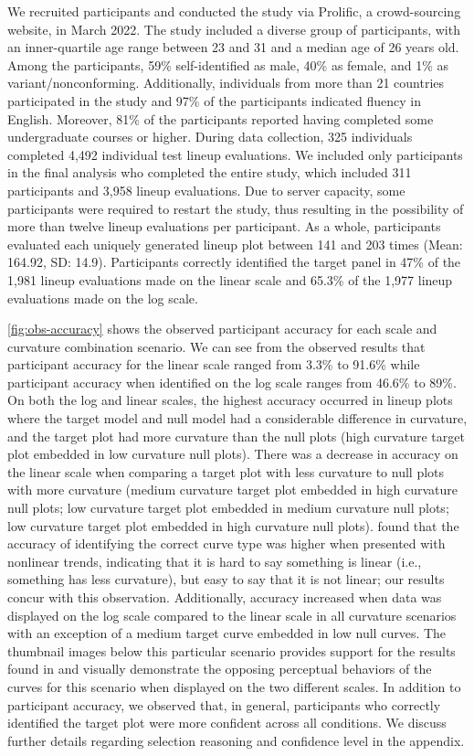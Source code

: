 \documentclass[12pt]{article}
\begin{document}
We recruited participants and conducted the study via Prolific, a
crowd-sourcing website, in March 2022. The study included a diverse
group of participants, with an inner-quartile age range between 23 and
31 and a median age of 26 years old. Among the participants, 59\%
self-identified as male, 40\% as female, and 1\% as
variant/nonconforming. Additionally, individuals from more than 21
countries participated in the study and 97\% of the participants
indicated fluency in English. Moreover, 81\% of the participants
reported having completed some undergraduate courses or higher. During
data collection, 325 individuals completed 4,492 individual test lineup
evaluations. We included only participants in the final analysis who
completed the entire study, which included 311 participants and 3,958
lineup evaluations. Due to server capacity, some participants were
required to restart the study, thus resulting in the possibility of more
than twelve lineup evaluations per participant. As a whole, participants
evaluated each uniquely generated lineup plot between 141 and 203 times
(Mean: 164.92, SD: 14.9). Participants correctly identified the target
panel in 47\% of the 1,981 lineup evaluations made on the linear scale
and 65.3\% of the 1,977 lineup evaluations made on the log scale.

\cref{fig:obs-accuracy} shows the observed participant accuracy for each
scale and curvature combination scenario. We can see from the observed
results that participant accuracy for the linear scale ranged from 3.3\%
to 91.6\% while participant accuracy when identified on the log scale
ranges from 46.6\% to 89\%. On both the log and linear scales, the
highest accuracy occurred in lineup plots where the target model and
null model had a considerable difference in curvature, and the target
plot had more curvature than the null plots (high curvature target plot
embedded in low curvature null plots). There was a decrease in accuracy
on the linear scale when comparing a target plot with less curvature to
null plots with more curvature (medium curvature target plot embedded in
high curvature null plots; low curvature target plot embedded in medium
curvature null plots; low curvature target plot embedded in high
curvature null plots). \citet{best_perception_2007} found that the
accuracy of identifying the correct curve type was higher when presented
with nonlinear trends, indicating that it is hard to say something is
linear (i.e., something has less curvature), but easy to say that it is
not linear; our results concur with this observation. Additionally,
accuracy increased when data was displayed on the log scale compared to
the linear scale in all curvature scenarios with an exception of a
medium target curve embedded in low null curves. The thumbnail images
below this particular scenario provides support for the results found in
\citet{best_perception_2007} and visually demonstrate the opposing
perceptual behaviors of the curves for this scenario when displayed on
the two different scales. In addition to participant accuracy, we
observed that, in general, participants who correctly identified the
target plot were more confident across all conditions. We discuss
further details regarding selection reasoning and confidence level in
the appendix.
\end{document}
